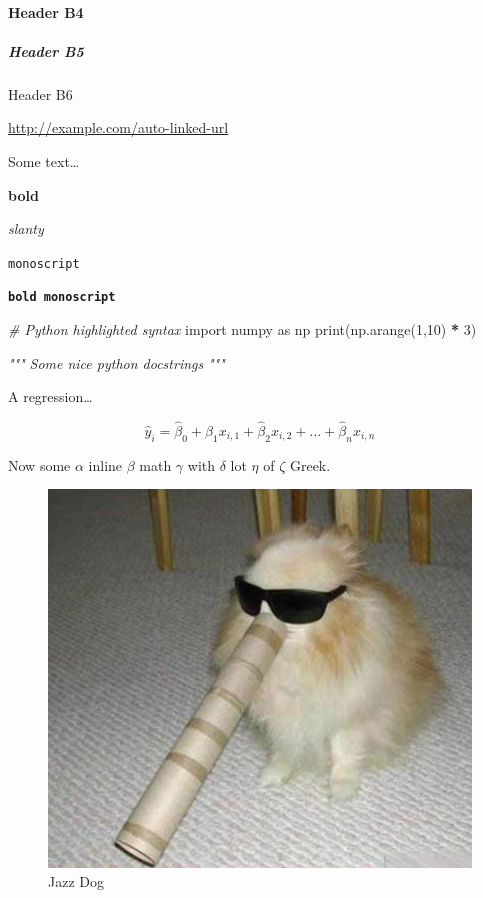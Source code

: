 \documentclass[
                ]
{article}
\newenvironment{Shaded}{\begin{snugshade}}{\end{snugshade}}
\newcommand{\BuiltInTok}[1]{#1}
\newcommand{\CommentTok}[1]{\textcolor[rgb]{0.56,0.35,0.01}{\textit{#1}}}
\newcommand{\DecValTok}[1]{\textcolor[rgb]{0.00,0.00,0.81}{#1}}
\newcommand{\ImportTok}[1]{#1}
\newcommand{\NormalTok}[1]{#1}
\newcommand{\OperatorTok}[1]{\textcolor[rgb]{0.81,0.36,0.00}{\textbf{#1}}}
\begin{document}
\hypertarget{header-b4}{%
\paragraph{Header B4}\label{header-b4}}

\hypertarget{header-b5}{%
\subparagraph{Header B5}\label{header-b5}}

Header B6

\url{http://example.com/auto-linked-url}

Some text\ldots{}

\textbf{bold}

\emph{slanty}

\texttt{monoscript}

\textbf{\texttt{bold\ monoscript}}

\begin{Shaded}
\begin{Highlighting}[]
\CommentTok{# Python highlighted syntax}
\ImportTok{import}\NormalTok{ numpy }\ImportTok{as}\NormalTok{ np}
\BuiltInTok{print}\NormalTok{(np.arange(}\DecValTok{1}\NormalTok{,}\DecValTok{10}\NormalTok{) }\OperatorTok{*} \DecValTok{3}\NormalTok{)}

\CommentTok{"""}
\CommentTok{Some nice python docstrings}
\CommentTok{"""}
\end{Highlighting}
\end{Shaded}

A regression\ldots{}

\[
\hat{y}_i = \hat{\beta}_0 + \hat{\beta}_1 x_{i,1} + \hat{\beta}_2 x_{i,2} + ... + \hat{\beta}_n x_{i,n}
\]

Now some \(\alpha\) inline \(\beta\) math \(\gamma\) with \(\delta\) lot
\(\eta\) of \(\zeta\) Greek.

\begin{figure}
\centering
\includegraphics{jazz_dog.jpeg}
\caption{Jazz Dog}
\end{figure}
\end{document}
